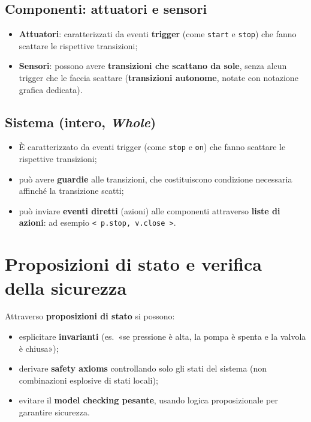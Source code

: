 \subsection{Componenti: attuatori e sensori}
\begin{itemize}
    \item \textbf{Attuatori}: caratterizzati da eventi \textbf{trigger} (come \texttt{start} e \texttt{stop}) che fanno scattare le rispettive transizioni;
    \item \textbf{Sensori}: possono avere \textbf{transizioni che scattano da sole}, senza alcun trigger che le faccia scattare (\textbf{transizioni autonome}, notate con notazione grafica dedicata).
\end{itemize}

\subsection{Sistema (intero, \emph{Whole})}
\begin{itemize}
    \item È caratterizzato da eventi trigger (come \texttt{stop} e \texttt{on}) che fanno scattare le rispettive transizioni;
    \item può avere \textbf{guardie} alle transizioni, che costituiscono condizione necessaria affinché la transizione scatti;
    \item può inviare \textbf{eventi diretti} (azioni) alle componenti attraverso \textbf{liste di azioni}: ad esempio \texttt{< p.stop, v.close >}.
\end{itemize}

\section{Proposizioni di stato e verifica della sicurezza}
Attraverso \textbf{proposizioni di stato} si possono:
\begin{itemize}
    \item esplicitare \textbf{invarianti} (es.\ «se pressione è alta, la pompa è spenta e la valvola è chiusa»);
    \item derivare \textbf{safety axioms} controllando solo gli stati del sistema (non combinazioni esplosive di stati locali);
    \item evitare il \textbf{model checking pesante}, usando logica proposizionale per garantire sicurezza.
\end{itemize}

